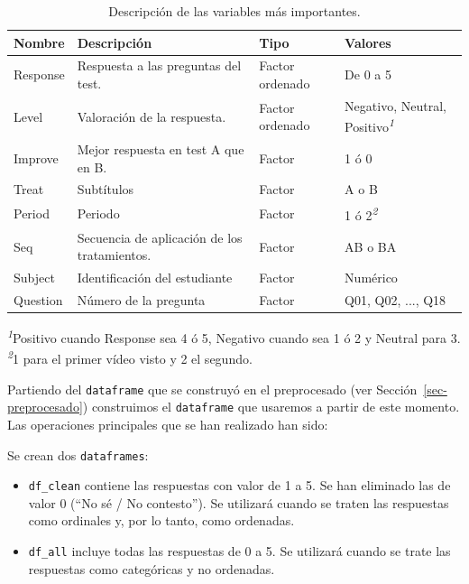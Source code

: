 \documentclass[
  12pt,
  a4paper,
  extrafontsizes,
  onecolumn,
  openright,
  table]{memoir}
\providecommand{\tightlist}{%
  \setlength{\itemsep}{0pt}\setlength{\parskip}{0pt}}\usepackage{longtable,booktabs,array}
\begin{document}
\hypertarget{tbl-variables}{}
\setlength{\LTpost}{0mm}
\begin{longtable}{llll}
\caption{\label{tbl-variables}Descripción de las variables más importantes. }\tabularnewline

\toprule
Nombre & Descripción & Tipo & Valores \\ 
\midrule
Response & Respuesta a las preguntas del test. & Factor ordenado & De 0 a 5 \\ 
Level & Valoración de la respuesta. & Factor ordenado & Negativo, Neutral, Positivo\textsuperscript{\textit{1}} \\ 
Improve & Mejor respuesta en test A que en B. & Factor & 1 ó 0 \\ 
Treat & Subtítulos & Factor & A o B \\ 
Period & Periodo & Factor & 1 ó 2\textsuperscript{\textit{2}} \\ 
Seq & Secuencia de aplicación de los tratamientos. & Factor & AB o BA \\ 
Subject & Identificación del estudiante & Factor & Numérico \\ 
Question & Número de la pregunta & Factor & Q01, Q02, ..., Q18 \\ 
\bottomrule
\end{longtable}
\begin{minipage}{\linewidth}
\textsuperscript{\textit{1}}Positivo cuando Response sea 4 ó 5, Negativo cuando sea 1 ó 2 y Neutral para 3.\\
\textsuperscript{\textit{2}}1 para el primer vídeo visto y 2 el segundo.\\
\end{minipage}

\normalsize

Partiendo del \texttt{dataframe} que se construyó en el preprocesado
(ver Sección~\ref{sec-preprocesado}) construimos el \texttt{dataframe}
que usaremos a partir de este momento. Las operaciones principales que
se han realizado han sido:

Se crean dos \texttt{dataframes}:

\begin{itemize}
\tightlist
\item
  \texttt{df\_clean} contiene las respuestas con valor de 1 a 5. Se han
  eliminado las de valor 0 (\enquote{No sé / No contesto}). Se utilizará
  cuando se traten las respuestas como ordinales y, por lo tanto, como
  ordenadas.
\item
  \texttt{df\_all} incluye todas las respuestas de 0 a 5. Se utilizará
  cuando se trate las respuestas como categóricas y no ordenadas.
\end{itemize}
\end{document}
